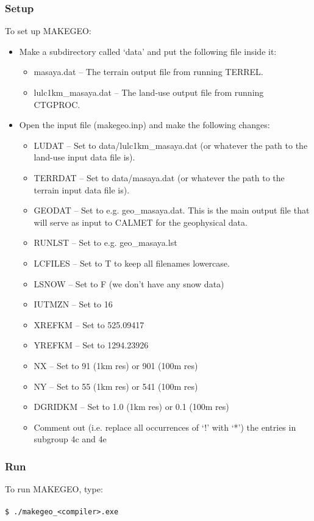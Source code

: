 \documentclass[10pt,a4paper]{article}
\newcommand\tab[1][0.5cm]{\hspace*{#1}}
\begin{document}
\subsubsection{Setup}
To set up MAKEGEO:
\begin{itemize}
\item Make a subdirectory called `data' and put the following file inside it:
\begin{itemize}
\item masaya.dat -- The terrain output file from running TERREL.
\item lulc1km\_masaya.dat -- The land-use output file from running CTGPROC.
\end{itemize}
\item Open the input file (makegeo.inp) and make the following changes:
\begin{itemize}
\item LUDAT -- Set to data/lulc1km\_masaya.dat (or whatever the path to the land-use input data file is).
\item TERRDAT -- Set to data/masaya.dat (or whatever the path to the terrain input data file is).
\item GEODAT -- Set to e.g. geo\_masaya.dat. This is the main output file that will serve as input to CALMET for the geophysical data.
\item RUNLST -- Set to e.g. geo\_masaya.lst
\item LCFILES -- Set to T to keep all filenames lowercase.
\item LSNOW -- Set to F (we don't have any snow data)
\item IUTMZN -- Set to 16
\item XREFKM -- Set to 525.09417
\item YREFKM -- Set to 1294.23926
\item NX -- Set to 91 (1km res) or 901 (100m res)
\item NY -- Set to 55 (1km res) or 541 (100m res)
\item DGRIDKM -- Set to 1.0 (1km res) or 0.1 (100m res)
\item Comment out (i.e. replace all occurrences of `!' with `*') the entries in subgroup 4c and 4e
\end{itemize}
\end{itemize}

\subsubsection{Run}
To run MAKEGEO, type:\\\\
\tab \texttt{\$ ./makegeo\_<compiler>.exe}
\end{document}

